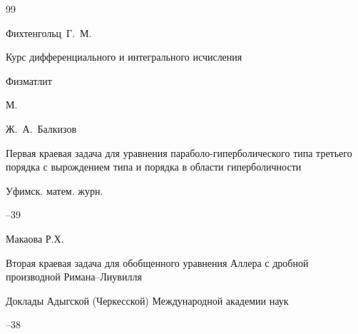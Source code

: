 \begin{thebibliography}{99}

\by Фихтенгольц~Г.~М.

\book Курс дифференциального и интегрального исчисления



\publ Физматлит

\publaddr М.







\by Ж.~А.~Балкизов

\paper Первая краевая задача для уравнения параболо-гиперболического типа третьего порядка с вырождением типа и порядка в области гиперболичности

\jour Уфимск. матем. журн.




--39


















\by Макаова Р.Х.

\paper Вторая краевая задача для обобщенного уравнения Аллера с дробной производной Римана--Лиувилля

\jour Доклады Адыгской (Черкесской) Международной академии наук




--38









\end{thebibliography}
